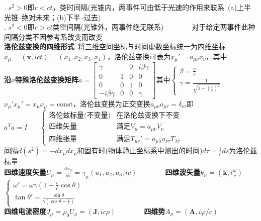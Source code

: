 \documentclass[10pt,a4paper]{article}
\begin{document}
\begin{multicols}{2}
. $s^2>0$即$r<ct$，类时间隔(光锥内，两事件可由低于光速的作用来联系~(a)上半光锥--绝对未来；(b)下半--过去)\\
. $s^2<0$即$r>ct$类空间隔(光锥外，两事件绝无联系)~~~~~~~~对于给定两事件此种间隔分类不因参考系改变而改变\scriptsize\\
\textbf{洛伦兹变换的四维形式}~将三维空间坐标与时间虚数坐标统一为四维坐标\\
\indent$x_{\mu}=(\bm{x},ict)=(x_1,x_2,x_3,x_4)$，洛伦兹变换可表为$x_{\mu}'=a_{\mu\nu}x_{\nu}$，其中\\
\indent\textbf{沿$x$特殊洛伦兹变换矩阵}$a=\left[\begin{array}{cccc}\gamma&&0&i\beta\gamma\\0&1&0&0\\0&0&1&0\\-i\beta\gamma&0&0&\gamma\end{array}\right]$其中$\left\{\begin{array}{l}\beta=\frac{v}{c}\\\gamma=\frac{1}{\sqrt{1-(\frac{v}{c})^2}}\end{array}\right.$\\
$x_{\mu}'x_{\mu}'=x_{\mu}x_{\mu}=\text{const}$，洛伦兹变换为正交变换$a_{\mu\nu}a_{\mu\tau}=\delta_{\nu\tau}$即$a^Ta=I~~~~~~~~\left\{\begin{array}{ll}\textbf{洛伦兹标量(不变量)}&\text{在洛伦兹变换下不变}\\\textbf{四维矢量}&\text{满足}V_{\mu}=a_{\mu\nu}V_{\nu}\\\textbf{四维张量}&\text{满足}T_{\mu\nu}'=a_{\mu\lambda}a_{\nu\tau}T_{\lambda\tau}\end{array}\right.$\\
间隔$d(s^2)=-dx_{\mu}dx_{\mu}$和固有时(物体静止坐标系中测出的时间)$d\tau=\frac{1}{c}ds$为洛伦兹标量\\
\textbf{四维速度矢量}$U_{\mu}=\frac{dx_{\mu}}{d\tau}=\gamma_{\mu}(u_1,u_2,u_3,ic)$~~~~~~~~\textbf{四维波矢量}$k_{\mu}=(\bm{k},i\frac{\omega}{c})$\\
$\left\{\begin{array}{l}\omega'=\omega\gamma(1-\frac{v}{c}\cos\theta)\\\tan\theta'=\frac{\sin\theta}{\gamma(\cos\theta-\frac{v}{c})}\end{array}\right.$\\
\textbf{四维电流密度}$J_{\mu}=\rho_0U_{\mu}=(\bm{J},ic\rho)$~~~~~~~~\textbf{四维势}$A_{\mu}=(\bm{A},i\varphi/c)$\\

\end{multicols}
\end{document}
